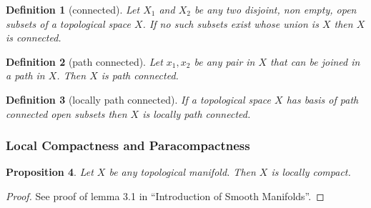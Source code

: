 \documentclass{article}
\newtheorem{theorem}{Theorem}[section]
\newtheorem{proposition}[theorem]{Proposition}
\newtheorem{definition}[theorem]{Definition}
\newtheorem{example}[theorem]{Example}
\begin{document}
\begin{definition}[connected]
Let $ X_{1} $ and $  X_{2} $ be any two disjoint, non empty,  open subsets of a topological space $ X $. If no such subsets exist whose union is $ X $ then $ X $ is connected.
\end{definition}
\begin{definition}[path connected]
  Let $ x_{1}, x_{2} $ be any pair in $ X $ that can be joined in a path in $ X $. Then $ X $ is path connected.
\end{definition}
\begin{definition}[locally path connected]
  If a topological space $ X $ has basis of path connected open subsets then $ X $ is locally path connected.
\end{definition}

\subsubsection{Local Compactness and Paracompactness}
\begin{proposition}
  Let $ X $ be any topological manifold. Then $ X $ is locally compact.
\end{proposition}

\begin{proof}
  See proof of lemma 3.1 in ``Introduction of Smooth Manifolds''.
\end{proof}










\end{document}

